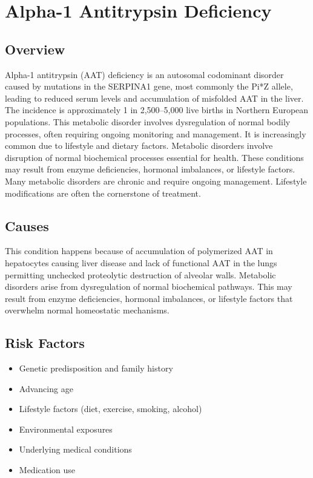 \chapter{Alpha-1 Antitrypsin Deficiency}
\label{sec:Alpha-1 Antitrypsin Deficiency}

\section{Overview}
Alpha-1 antitrypsin (AAT) deficiency is an autosomal codominant disorder caused by mutations in the SERPINA1 gene, most commonly the Pi*Z allele, leading to reduced serum levels and accumulation of misfolded AAT in the liver. The incidence is approximately 1 in 2,500--5,000 live births in Northern European populations. This metabolic disorder involves dysregulation of normal bodily processes, often requiring ongoing monitoring and management. It is increasingly common due to lifestyle and dietary factors. Metabolic disorders involve disruption of normal biochemical processes essential for health. These conditions may result from enzyme deficiencies, hormonal imbalances, or lifestyle factors. Many metabolic disorders are chronic and require ongoing management. Lifestyle modifications are often the cornerstone of treatment.
\section{Causes}
This condition happens because of accumulation of polymerized AAT in hepatocytes causing liver disease and lack of functional AAT in the lungs permitting unchecked proteolytic destruction of alveolar walls. Metabolic disorders arise from dysregulation of normal biochemical pathways. This may result from enzyme deficiencies, hormonal imbalances, or lifestyle factors that overwhelm normal homeostatic mechanisms.   
\section{Risk Factors}
\begin{itemize}[noitemsep]
  \item Genetic predisposition and family history
  \item Advancing age
  \item Lifestyle factors (diet, exercise, smoking, alcohol)
  \item Environmental exposures
  \item Underlying medical conditions
  \item Medication use
\end{itemize}
